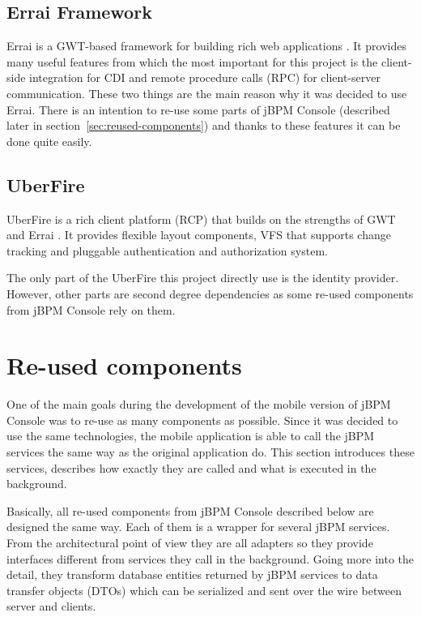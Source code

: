 \documentclass[12pt,oneside,final]{fithesis2}
\begin{document}
\subsection{Errai Framework}
Errai is a GWT-based framework for building rich web applications \cite{erraidoc}.
It provides many useful features from which the most important for this project is the client-side integration for CDI\footnotemark{} and remote procedure calls (RPC) for client-server communication.
These two things are the main reason why it was decided to use Errai.
There is an intention to re-use some parts of jBPM Console (described later in section~\ref{sec:reused-components}) and thanks to these features it can be done quite easily.

\subsection{UberFire}
UberFire is a rich client platform (RCP) that builds on the strengths of GWT and Errai \cite{uberfire}.
It provides flexible layout components, VFS that supports change tracking and pluggable authentication and authorization system.

The only part of the UberFire this project directly use is the identity provider.
However, other parts are second degree dependencies as some re-used components from jBPM Console rely on them.

\section{Re-used components}
One of the main goals during the development of the mobile version of jBPM Console was to re-use as many components as possible.
Since it was decided to use the same technologies, the mobile application is able to call the jBPM services the same way as the original application do.
This section introduces these services, describes how exactly they are called and what is executed in the background.

Basically, all re-used components from jBPM Console described below are designed the same way.
Each of them is a wrapper for several jBPM services.
From the architectural point of view they are all adapters so they provide interfaces different from services they call in the background.
Going more into the detail, they transform database entities returned by jBPM services to data transfer objects (DTOs) which can be serialized and sent over the wire between server and clients.
\end{document}
